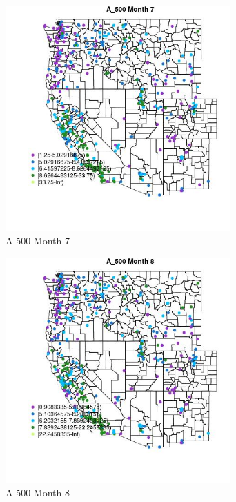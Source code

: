 \begin{figure} 
\centering  
\includegraphics[width=0.77\textwidth]{Code_Outputs/ML_input_report_ML_input_PM25_Step5_part_d_de_duplicated_aves_ML_input_MapObsMo7A_500.jpg} 
\caption{\label{fig:ML_input_report_ML_input_PM25_Step5_part_d_de_duplicated_aves_ML_inputMapObsMo7A_500}A-500 Month 7} 
\end{figure} 
 

\begin{figure} 
\centering  
\includegraphics[width=0.77\textwidth]{Code_Outputs/ML_input_report_ML_input_PM25_Step5_part_d_de_duplicated_aves_ML_input_MapObsMo8A_500.jpg} 
\caption{\label{fig:ML_input_report_ML_input_PM25_Step5_part_d_de_duplicated_aves_ML_inputMapObsMo8A_500}A-500 Month 8} 
\end{figure} 
 


